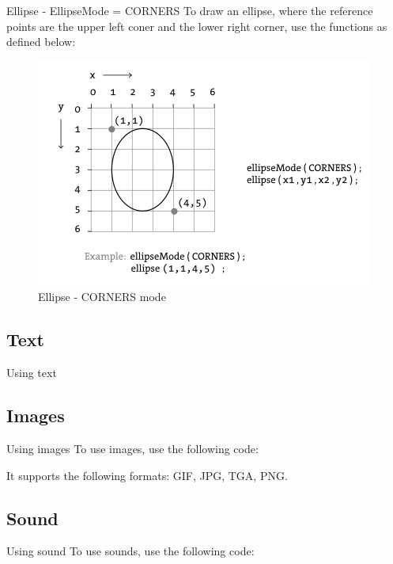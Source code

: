 \documentclass{beamer}
\begin{document}
\begin{frame}{Ellipse - EllipseMode = CORNERS}
To draw an ellipse, where the reference points are the upper left coner and 
the lower right corner, use the functions as defined below:\\

\begin{figure}[H]
\centerline{\includegraphics[scale=0.5]{ellipse_corners_mode.png}}
\caption{Ellipse - CORNERS mode}
\end{figure}
\end{frame}

\subsection{Text}

\begin{frame}{Using text}
\lstText
\end{frame}

\subsection{Images}

\begin{frame}{Using images}
To use images, use the following code:\\

\lstImages

It supports the following formats: GIF, JPG, TGA, PNG.
\end{frame}

\subsection{Sound}

\begin{frame}{Using sound}
To use sounds, use the following code:\\

\lstSounds
\end{frame}
\end{document}
